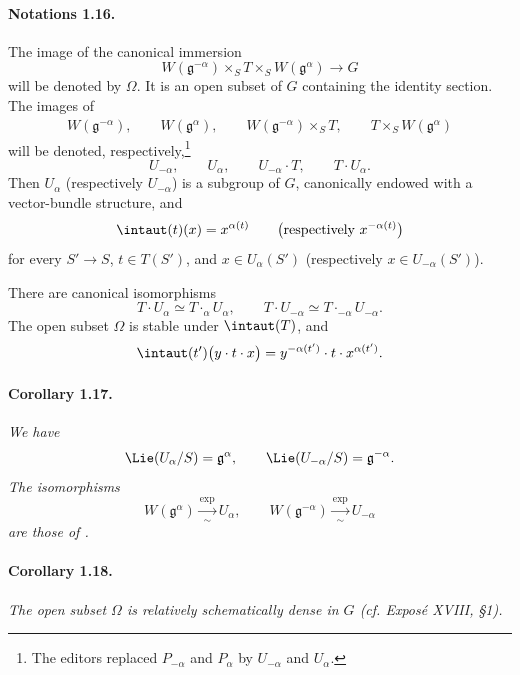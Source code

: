 \paragraph{\textbf{Notations 1.16.}}
The image of the canonical immersion
\[
  W(\mathfrak g^{-\alpha})\times_S T
    \times_S W(\mathfrak g^\alpha)\longrightarrow G
\]
will be denoted by \(\Omega\). It is an open subset of \(G\)
containing the identity section. The images of
\[
\begin{gathered}
  W(\mathfrak g^{-\alpha}),\qquad W(\mathfrak g^\alpha),\qquad
  W(\mathfrak g^{-\alpha})\times_S T,\qquad
  T\times_S W(\mathfrak g^\alpha)
\end{gathered}
\]
will be denoted, respectively,\footnote{The editors replaced
\(P_{-\alpha}\) and \(P_\alpha\) by \(U_{-\alpha}\) and
\(U_\alpha\).}
\[
  U_{-\alpha},\qquad U_\alpha,\qquad
  U_{-\alpha}\mathbin{\cdot}T,\qquad T\mathbin{\cdot}U_\alpha.
\]
Then \(U_\alpha\) (respectively \(U_{-\alpha}\)) is a subgroup of
\(G\), canonically endowed with a vector-bundle structure, and
\[
  \intaut(t)(x)=x^{\alpha(t)}
  \qquad
  \bigl(\text{respectively }x^{-\alpha(t)}\bigr)
\]
for every \(S'\to S\), \(t\in T(S')\), and
\(x\in U_\alpha(S')\) (respectively \(x\in U_{-\alpha}(S')\)).

There are canonical isomorphisms
\[
  T\mathbin{\cdot}U_\alpha\simeq T\mathbin{\cdot_\alpha}U_\alpha,
  \qquad
  T\mathbin{\cdot}U_{-\alpha}
    \simeq T\mathbin{\cdot_{-\alpha}}U_{-\alpha}.
\]
The open subset \(\Omega\) is stable under \(\intaut(T)\), and
\[
  \intaut(t')\bigl(y\mathbin{\cdot}t\mathbin{\cdot}x\bigr)
    =y^{-\alpha(t')}\mathbin{\cdot}t
       \mathbin{\cdot}x^{\alpha(t')}.
\]

\paragraph{\textbf{Corollary 1.17.}}
\emph{We have}
\[
  \Lie(U_\alpha/S)=\mathfrak g^\alpha,\qquad
  \Lie(U_{-\alpha}/S)=\mathfrak g^{-\alpha}.
\]
\emph{The isomorphisms}
\[
  W(\mathfrak g^\alpha)\xrightarrow[\sim]{\exp}U_\alpha,
  \qquad
  W(\mathfrak g^{-\alpha})\xrightarrow[\sim]{\exp}U_{-\alpha}
\]
\emph{are those of .}

\paragraph{\textbf{Corollary 1.18.}}
\emph{The open subset \(\Omega\) is relatively schematically dense
in \(G\) \textup{(cf. Exposé XVIII, \S1)}.}

